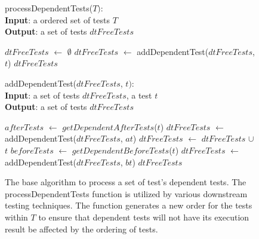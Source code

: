 \begin{figure}[t]
	processDependentTests($\mathit{T}):$\\
	\textbf{Input}: a ordered set of tests $\mathit{T}$\\
	\textbf{Output}: a set of tests $\mathit{dtFreeTests}$\\
	\vspace{-5mm}
	\begin{algorithmic}[1]
		\STATE $\mathit{dtFreeTests}$ $\leftarrow$ $\emptyset$
			\STATE $\mathit{dtFreeTests}$ $\leftarrow$
			addDependentTest($\mathit{dtFreeTests}$, $\mathit{t}$)	
		\ENDFOR
		\RETURN $\mathit{dtFreeTests}$
	\end{algorithmic}

	addDependentTest($\mathit{dtFreeTests}$, $\mathit{t}):$\\
	\textbf{Input}: a set of tests $\mathit{dtFreeTests}$,
	a test $\mathit{t}$\\
	\textbf{Output}: a set of tests $\mathit{dtFreeTests}$\\
	\vspace{-5mm}
	\begin{algorithmic}[1]
			\STATE $\mathit{afterTests}$ $\leftarrow$
			$\mathit{getDependentAfterTests}$($\mathit{t}$)
				\STATE $\mathit{dtFreeTests}$ $\leftarrow$
				addDependentTest($\mathit{dtFreeTests}$, $\mathit{at}$)
			\ENDFOR
			\STATE $\mathit{dtFreeTests}$ $\leftarrow$ $\mathit{dtFreeTests}$
			$\cup$ $\mathit{t}$
			\STATE $\mathit{beforeTests}$ $\leftarrow$
			$\mathit{getDependentBeforeTests}$($\mathit{t}$)
				\STATE $\mathit{dtFreeTests}$ $\leftarrow$
				addDependentTest($\mathit{dtFreeTests}$, $\mathit{bt}$)
			\ENDFOR
		\ENDIF
		\RETURN $\mathit{dtFreeTests}$
	\end{algorithmic}
	\vspace{-3mm}
	\caption {
		The base algorithm to process a set of test's dependent tests. The
		 processDependentTests function is utilized by various downstream
		 testing techniques. The function generates a new order for the tests
		 within $\mathit{T}$ to ensure that dependent tests will not have its
		 execution result be affected by the ordering of tests. 
	}
	\label{fig:processDT}
\end{figure}

